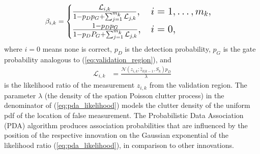 \begin{align}
    \beta_{i,k} &=
    \begingroup
    \Large
    \begin{cases}
        \frac{\mathcal{L}_{i,k}}{1-p_D p_G + \sum_{j=1}^{m_k}\mathcal{L}_{j,k}}, & i=1, \dots, m_k, \\
        \frac{1-p_D p_G}{1-p_D P_G + \sum_{j=1}^{m_k}\mathcal{L}_{j,k}}, & i =0,
    \end{cases}
    \label{eq:pda_beta}
    \endgroup
\end{align}
where $i=0$ means none is correct, $p_D$ is the detection probability, $p_G$ is the gate probability analogous to (\ref{eq:validation_region}), and
\begin{align}
    \mathcal{L}_{i,k} &= \frac{\mathcal{N}(z_{i,k};\hat{z}_{k|k-1}, S_k) p_D}{\lambda} \label{eq:pda_likelihood}
\end{align}
is the likelihood ratio of the measurement $z_{i,k}$ from the validation region. The parameter $\lambda$ (the density of the spation Poisson clutter process) in the denominator of (\ref{eq:pda_likelihood}) models the clutter density of the uniform pdf of the location of false measurement. The Probabilistic Data Association (PDA) algorithm produces association probabilities that are influenced by the position of the respective innovation on the Gaussian exponential of the likelihood ratio (\ref{eq:pda_likelihood}), in comparison to other innovations.

